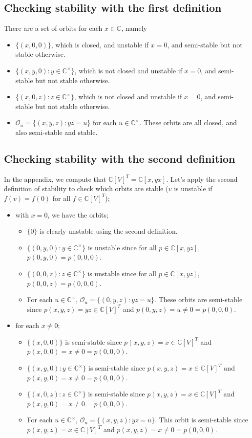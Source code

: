 \documentclass[12pt]{amsart}
\newcommand{\C}{\mathbb{C}}
\theoremstyle{remark}
\theoremstyle{remark}
\begin{document}
\subsection*{Checking stability with the first definition}
There are a set of orbits for each $x \in \C$, namely
\begin{itemize}[label=-]
\item $\{(x, 0, 0)\}$, which is closed, and unstable if $x = 0$, and semi-stable but not stable otherwise.
\item $\{(x, y, 0) : y \in \C^\times\}$, which is not closed and unstable if $x=0$, and semi-stable but not stable otherwise.
\item $\{(x, 0, z) : z \in\C^\times\}$, which is not closed and unstable if $x=0$, and semi-stable but not stable otherwise.
\item $\mathcal{O}_u = \{(x, y, z) : yz = u\}$ for each $u \in \C^\times$.
These orbits are all closed, and also semi-stable and stable.
\end{itemize}


\subsection*{Checking stability with the second definition}
In the appendix, we compute that $\C[V]^T = \C[x, yx]$.
Let's apply the second definition of stability to check which orbits are stable ($v$ is unstable if $f(v) = f(0)$ for all $f \in \C[V]^T$);
\begin{itemize}[label=--]
\item with $x = 0$, we have the orbits;
	\begin{itemize}
	\item $\{0\}$ is clearly unstable using the second definition.
	\item $\{(0, y, 0) : y \in \C^\times\}$ is unstable since for all $p \in \C[x, yz]$, $p(0, y, 0) = p(0, 0, 0)$.
	\item $\{(0, 0, z) : z \in \C^\times\}$ is unstable since for all $p \in \C[x, yz]$, $p(0, 0, z) = p(0, 0, 0)$.
	\item For each $u\in \C^\times$, $\mathcal{O}_u = \{(0, y, z) : yz = u\}$. These orbits are semi-stable since $p(x,y,z) = yz \in \C[V]^T$ and $p(0, y, z) = u \ne 0 = p(0, 0, 0)$.
	\end{itemize}
\item for each $x \ne 0$;
	\begin{itemize}
	\item $\{(x, 0, 0)\}$ is semi-stable since $p(x, y, z) = x \in \C[V]^T$ and $p(x, 0, 0) = x \ne 0 = p(0, 0, 0)$.
	\item $\{(x, y, 0) : y \in \C^\times\}$ is semi-stable since $p(x, y, z) = x \in \C[V]^T$ and $p(x, y, 0) = x \ne 0 = p(0, 0, 0)$.
	\item $\{(x, 0, z) : z \in \C^\times\}$ is semi-stable since $p(x, y, z) = x \in \C[V]^T$ and $p(x, y, 0) = x \ne 0 = p(0, 0, 0)$.
	\item For each $u\in \C^\times$, $\mathcal{O}_u = \{(x, y, z) : yz = u\}$.
	This orbit is semi-stable since $p(x, y, z) = x \in \C[V]^T$ and $p(x, y, z) = x \ne 0 = p(0, 0, 0)$.
	\end{itemize}
\end{itemize}
\end{document}
